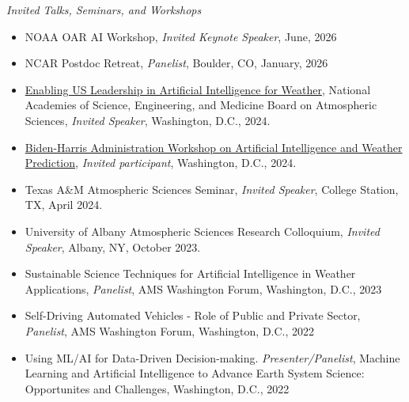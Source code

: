 \documentclass[11pt,letterpaper]{article}
\begin{document}
\emph{Invited Talks, Seminars, and Workshops}
\medskip
\begin{itemize}[itemindent=-10pt]


 \item NOAA OAR AI Workshop, \textit{Invited Keynote Speaker}, June, 2026

 \item NCAR Postdoc Retreat, \textit{Panelist}, Boulder, CO, January, 2026

 \item \href{https://www.nationalacademies.org/event/42497_05-2024_enabling-us-leadership-in-artificial-intelligence-for-weather}{Enabling US Leadership in Artificial Intelligence for Weather}, National Academies of Science, Engineering, and Medicine Board on Atmospheric Sciences, \textit{Invited Speaker}, Washington, D.C., 2024.

 \item \href{https://www.whitehouse.gov/ostp/news-updates/2024/05/10/readout-biden-harris-administration-workshop-on-artificial-intelligence-and-weather-prediction/}{Biden-⁠Harris Administration Workshop on Artificial Intelligence and Weather Prediction}, \textit{Invited participant}, Washington, D.C., 2024.

 \item Texas A\&M Atmospheric Sciences Seminar, \textit{Invited Speaker}, College Station, TX, April 2024.

 \item University of Albany Atmospheric Sciences Research Colloquium, \textit{Invited Speaker}, Albany, NY, October 2023.

 \item Sustainable Science Techniques for Artificial Intelligence in Weather Applications, \textit{Panelist}, AMS Washington Forum, Washington, D.C., 2023

 \item Self-Driving Automated Vehicles - Role of Public and Private Sector, \textit{Panelist}, AMS Washington Forum, Washington, D.C., 2022
 
 \item Using ML/AI for Data-Driven Decision-making. \textit{Presenter/Panelist}, Machine Learning and Artificial Intelligence to Advance Earth System Science: Opportunites and Challenges, Washington, D.C., 2022
 

\end{itemize}
\end{document}
